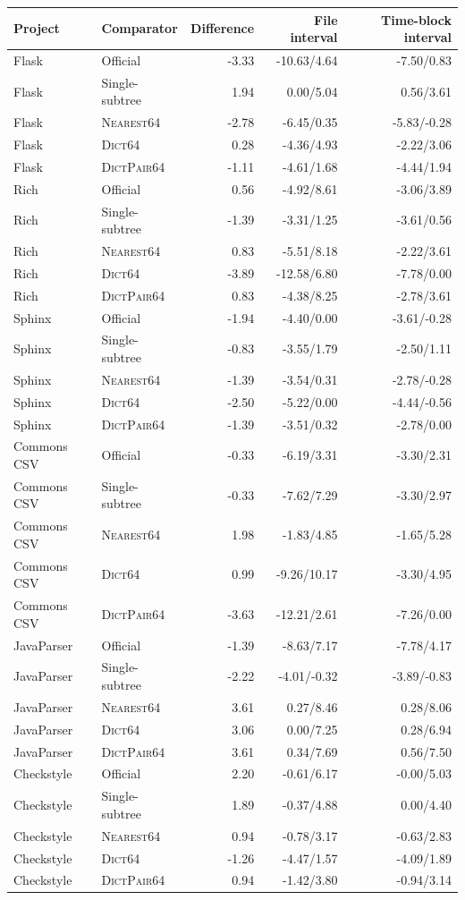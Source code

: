 \begin{longtable}{llrrr}
\toprule
Project & Comparator & Difference & File interval & Time-block interval \\
\midrule\endhead
Flask & Official & -3.33 & -10.63/4.64 & -7.50/0.83 \\
Flask & Single-subtree & 1.94 & 0.00/5.04 & 0.56/3.61 \\
Flask & \textsc{Nearest64} & -2.78 & -6.45/0.35 & -5.83/-0.28 \\
Flask & \textsc{Dict64} & 0.28 & -4.36/4.93 & -2.22/3.06 \\
Flask & \textsc{DictPair64} & -1.11 & -4.61/1.68 & -4.44/1.94 \\
Rich & Official & 0.56 & -4.92/8.61 & -3.06/3.89 \\
Rich & Single-subtree & -1.39 & -3.31/1.25 & -3.61/0.56 \\
Rich & \textsc{Nearest64} & 0.83 & -5.51/8.18 & -2.22/3.61 \\
Rich & \textsc{Dict64} & -3.89 & -12.58/6.80 & -7.78/0.00 \\
Rich & \textsc{DictPair64} & 0.83 & -4.38/8.25 & -2.78/3.61 \\
Sphinx & Official & -1.94 & -4.40/0.00 & -3.61/-0.28 \\
Sphinx & Single-subtree & -0.83 & -3.55/1.79 & -2.50/1.11 \\
Sphinx & \textsc{Nearest64} & -1.39 & -3.54/0.31 & -2.78/-0.28 \\
Sphinx & \textsc{Dict64} & -2.50 & -5.22/0.00 & -4.44/-0.56 \\
Sphinx & \textsc{DictPair64} & -1.39 & -3.51/0.32 & -2.78/0.00 \\
Commons CSV & Official & -0.33 & -6.19/3.31 & -3.30/2.31 \\
Commons CSV & Single-subtree & -0.33 & -7.62/7.29 & -3.30/2.97 \\
Commons CSV & \textsc{Nearest64} & 1.98 & -1.83/4.85 & -1.65/5.28 \\
Commons CSV & \textsc{Dict64} & 0.99 & -9.26/10.17 & -3.30/4.95 \\
Commons CSV & \textsc{DictPair64} & -3.63 & -12.21/2.61 & -7.26/0.00 \\
JavaParser & Official & -1.39 & -8.63/7.17 & -7.78/4.17 \\
JavaParser & Single-subtree & -2.22 & -4.01/-0.32 & -3.89/-0.83 \\
JavaParser & \textsc{Nearest64} & 3.61 & 0.27/8.46 & 0.28/8.06 \\
JavaParser & \textsc{Dict64} & 3.06 & 0.00/7.25 & 0.28/6.94 \\
JavaParser & \textsc{DictPair64} & 3.61 & 0.34/7.69 & 0.56/7.50 \\
Checkstyle & Official & 2.20 & -0.61/6.17 & -0.00/5.03 \\
Checkstyle & Single-subtree & 1.89 & -0.37/4.88 & 0.00/4.40 \\
Checkstyle & \textsc{Nearest64} & 0.94 & -0.78/3.17 & -0.63/2.83 \\
Checkstyle & \textsc{Dict64} & -1.26 & -4.47/1.57 & -4.09/1.89 \\
Checkstyle & \textsc{DictPair64} & 0.94 & -1.42/3.80 & -0.94/3.14 \\
\bottomrule
\end{longtable}
